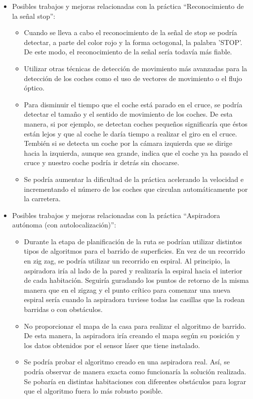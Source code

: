 \begin{itemize}
\item Posibles trabajos y mejoras relacionadas con la práctica ``Reconocimiento de la señal stop'':

	\begin{itemize}
	\item Cuando se lleva a cabo el reconocimiento de la señal de stop se podría detectar, a parte del color rojo y la forma octogonal, la palabra 'STOP'. De este modo, el reconocimiento de la señal sería todavía más fiable.
	\item Utilizar otras técnicas de detección de movimiento más avanzadas para la detección de los coches como el uso de vectores de movimiento o el flujo óptico.
	\item Para disminuir el tiempo que el coche está parado en el cruce, se podría detectar el tamaño y el sentido de movimiento de los coches. De esta manera, si por ejemplo, se detectan coches pequeños significaría que éstos están lejos y que al coche le daría tiempo a realizar el giro en el cruce. Tembién si se detecta un coche por la cámara izquierda que se dirige hacia la izquierda, aunque sea grande, indica que el coche ya ha pasado el cruce y nuestro coche podría ir detrás sin chocarse.
	\item Se podría aumentar la dificultad de la práctica acelerando la velocidad e incrementando el número de los coches que circulan automáticamente por la carretera.
	\end{itemize}
	
\item Posibles trabajos y mejoras relacionadas con la práctica ``Aspiradora autónoma (con autolocalización)'':

	\begin{itemize}
	\item Durante la etapa de planificación de la ruta se podrían utilizar distintos tipos de algoritmos para el barrido de superficies. En vez de un recorrido en zig zag, se podría utilizar un recorrido en espiral. Al principio, la aspiradora iría al lado de la pared y realizaría la espiral hacia el interior de cada habitación. Seguiría guradando los puntos de retorno de la misma manera que en el zigzag y el punto crítico para comenzar una nueva espiral sería cuando la aspiradora tuviese todas las casillas que la rodean barridas o con obstáculos.
	\item No proporcionar el mapa de la casa para realizar el algoritmo de barrido. De esta manera, la aspiradora iría creando el mapa según su posición y los datos obtenidos por el sensor láser que tiene instalado.
	\item Se podría probar el algoritmo creado en una aspiradora real. Así, se podría observar de manera exacta como funcionaría la solución realizada. Se pobaría en distintas habitaciones con diferentes obstáculos para lograr que el algoritmo fuera lo más robusto posible. 
	\end{itemize}
\end{itemize}


